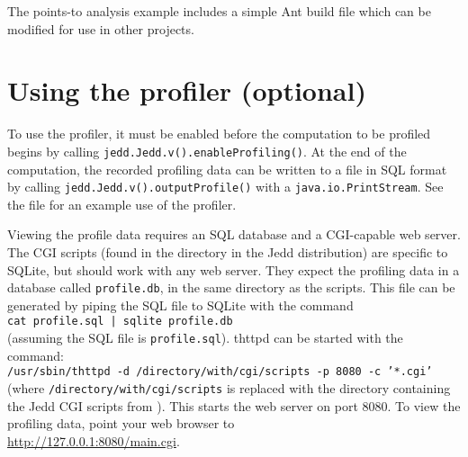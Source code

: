 \documentclass{article}
\begin{document}
The points-to analysis example includes a simple Ant build file
which can be modified for use in other projects.

\section{Using the profiler (optional)}
To use the profiler, it must be enabled before the computation to be profiled
begins by calling {\tt jedd.Jedd.v().enableProfiling()}. At the end of
the computation, the recorded profiling data can be written to a file
in SQL format by calling {\tt jedd.Jedd.v().outputProfile()} with a
{\tt java.io.PrintStream}. See the file 
for an example use of the profiler.

Viewing the profile data requires an SQL database and a CGI-capable web
server. The CGI scripts (found in the  directory in the Jedd
distribution) are specific to SQLite, but should work with any
web server. They expect the profiling data in a database called
{\tt profile.db}, in the same directory as the scripts. This file can be
generated by piping the SQL file to SQLite with the command\\
{\tt cat profile.sql | sqlite profile.db}\\
(assuming the SQL file
is {\tt profile.sql}). thttpd can be started with the command:\\
{\tt /usr/sbin/thttpd -d /directory/with/cgi/scripts -p 8080 -c '*.cgi'}
(where {\tt /directory/with/cgi/scripts} is replaced with the directory
containing the Jedd CGI scripts from ). This starts
the web server on port 8080. To view the profiling data, point your
web browser to\\
\url{http://127.0.0.1:8080/main.cgi}.



\end{document}
